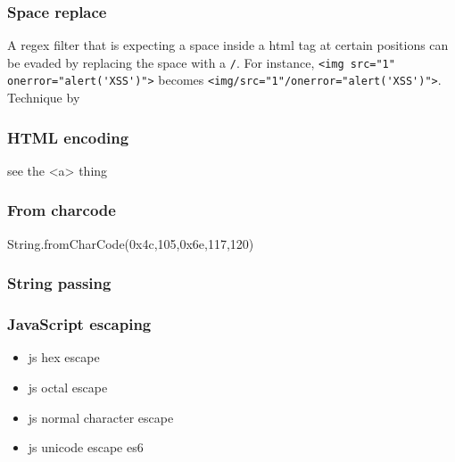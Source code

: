 \subsubsection{Space replace}
A regex filter that is expecting a space inside a html tag at certain positions can be evaded by replacing the space with a \verb|/|.
For instance, \verb|<img src="1" onerror="alert('XSS')">| becomes \verb|<img/src="1"/onerror="alert('XSS')">|.
Technique by \cite{medium/allypetitt}

\subsubsection{HTML encoding}
see the <a> thing

\subsubsection{From charcode}
String.fromCharCode(0x4c,105,0x6e,117,120) \cite{asecsite/jsobf1}

\subsubsection{String passing}
\subsubsection{JavaScript escaping}
\label{sec:jsescape}
\begin{itemize}
\item js hex escape 
\item js octal escape
\item js normal character escape
\item js unicode escape es6
\end{itemize}

